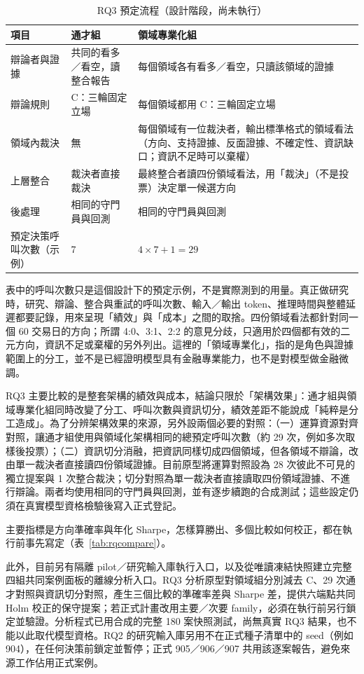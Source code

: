 \begin{table}[H]\centering\small
\caption{RQ3 預定流程（設計階段，尚未執行）}
\label{tab:rq3flow}
\begin{tabularx}{\textwidth}{@{}L{.17} Y Y@{}}\toprule
項目 & 通才組 & 領域專業化組 \\\midrule
辯論者與證據 & 共同的看多／看空，讀整合報告 & 每個領域各有看多／看空，只讀該領域的證據 \\
辯論規則 & C：三輪固定立場 & 每個領域都用 C：三輪固定立場 \\
領域內裁決 & 無 & 每個領域有一位裁決者，輸出標準格式的領域看法（方向、支持證據、反面證據、不確定性、資訊缺口；資訊不足時可以棄權） \\
上層整合 & 裁決者直接裁決 & 最終整合者讀四份領域看法，用「裁決」（不是投票）決定單一候選方向 \\
後處理 & 相同的守門員與回測 & 相同的守門員與回測 \\
預定決策呼叫次數（示例） & 7 & $4\times7+1=29$ \\
\bottomrule\end{tabularx}\end{table}

表中的呼叫次數只是這個設計下的預定示例，不是實際測到的用量。真正做研究時，研究、辯論、整合與重試的呼叫次數、輸入／輸出 token、推理時間與整體延遲都要記錄，用來呈現「績效」與「成本」之間的取捨。四份領域看法都針對同一個 60 交易日的方向；所謂 4:0、3:1、2:2 的意見分歧，只適用於四個都有效的二元方向，資訊不足或棄權的另外列出。這裡的「領域專業化」，指的是角色與證據範圍上的分工，並不是已經證明模型具有金融專業能力，也不是對模型做金融微調。

RQ3 主要比較的是整套架構的績效與成本，結論只限於「架構效果」：通才組與領域專業化組同時改變了分工、呼叫次數與資訊切分，績效差距不能說成「純粹是分工造成」。為了分辨架構效果的來源，另外設兩個必要的對照：（一）運算資源對齊對照，讓通才組使用與領域化架構相同的總預定呼叫次數（約 29 次，例如多次取樣後投票）；（二）資訊切分消融，把資訊同樣切成四個領域，但各領域不辯論，改由單一裁決者直接讀四份領域證據。目前原型將運算對照設為 28 次彼此不可見的獨立提案與 1 次整合裁決；切分對照為單一裁決者直接讀取四份領域證據、不進行辯論。兩者均使用相同的守門員與回測，並有逐步續跑的合成測試；這些設定仍須在真實模型資格檢驗後寫入正式登記。

主要指標是方向準確率與年化 Sharpe，怎樣算勝出、多個比較如何校正，都在執行前事先寫定（表~\ref{tab:rqcompare}）。

此外，目前另有隔離 pilot／研究輸入庫執行入口，以及從唯讀凍結快照建立完整四組共同案例面板的離線分析入口。RQ3 分析原型對領域組分別減去 C、29 次通才對照與資訊切分對照，產生三個比較的準確率差與 Sharpe 差，提供六端點共同 Holm 校正的保守提案；若正式計畫改用主要／次要 family，必須在執行前另行鎖定並驗證。分析程式已用合成的完整 180 案快照測試，尚無真實 RQ3 結果，也不能以此取代模型資格。RQ2 的研究輸入庫另用不在正式種子清單中的 seed（例如 904），在任何決策前鎖定並暫停；正式 905／906／907 共用該逐案報告，避免來源工作佔用正式案例。


